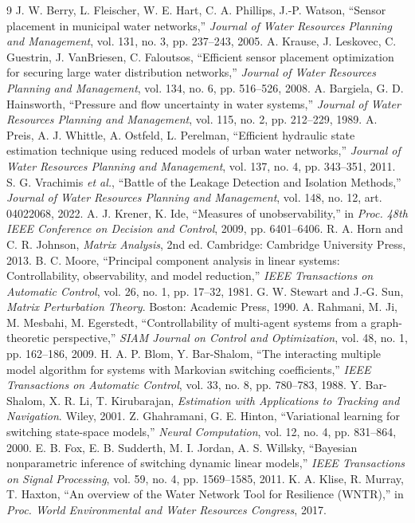 \documentclass[conference]{IEEEtran}
\begin{document}
\begin{thebibliography}{9}
 J. W. Berry, L. Fleischer, W. E. Hart, C. A. Phillips, J.-P. Watson, ``Sensor placement in municipal water networks,'' \emph{Journal of Water Resources Planning and Management}, vol. 131, no. 3, pp. 237--243, 2005.
 A. Krause, J. Leskovec, C. Guestrin, J. VanBriesen, C. Faloutsos, ``Efficient sensor placement optimization for securing large water distribution networks,'' \emph{Journal of Water Resources Planning and Management}, vol. 134, no. 6, pp. 516--526, 2008.
 A. Bargiela, G. D. Hainsworth, ``Pressure and flow uncertainty in water systems,'' \emph{Journal of Water Resources Planning and Management}, vol. 115, no. 2, pp. 212--229, 1989.
 A. Preis, A. J. Whittle, A. Ostfeld, L. Perelman, ``Efficient hydraulic state estimation technique using reduced models of urban water networks,'' \emph{Journal of Water Resources Planning and Management}, vol. 137, no. 4, pp. 343--351, 2011.
 S. G. Vrachimis \emph{et al.}, ``Battle of the Leakage Detection and Isolation Methods,'' \emph{Journal of Water Resources Planning and Management}, vol. 148, no. 12, art. 04022068, 2022.
 A. J. Krener, K. Ide, ``Measures of unobservability,'' in \emph{Proc. 48th IEEE Conference on Decision and Control}, 2009, pp. 6401--6406.
 R. A. Horn and C. R. Johnson, \emph{Matrix Analysis}, 2nd ed. Cambridge: Cambridge University Press, 2013.
 B. C. Moore, ``Principal component analysis in linear systems: Controllability, observability, and model reduction,'' \emph{IEEE Transactions on Automatic Control}, vol. 26, no. 1, pp. 17--32, 1981.
 G. W. Stewart and J.-G. Sun, \emph{Matrix Perturbation Theory}. Boston: Academic Press, 1990.
 A. Rahmani, M. Ji, M. Mesbahi, M. Egerstedt, ``Controllability of multi-agent systems from a graph-theoretic perspective,'' \emph{SIAM Journal on Control and Optimization}, vol. 48, no. 1, pp. 162--186, 2009.
 H. A. P. Blom, Y. Bar-Shalom, ``The interacting multiple model algorithm for systems with Markovian switching coefficients,'' \emph{IEEE Transactions on Automatic Control}, vol. 33, no. 8, pp. 780--783, 1988.
 Y. Bar-Shalom, X. R. Li, T. Kirubarajan, \emph{Estimation with Applications to Tracking and Navigation}. Wiley, 2001.
 Z. Ghahramani, G. E. Hinton, ``Variational learning for switching state-space models,'' \emph{Neural Computation}, vol. 12, no. 4, pp. 831--864, 2000.
 E. B. Fox, E. B. Sudderth, M. I. Jordan, A. S. Willsky, ``Bayesian nonparametric inference of switching dynamic linear models,'' \emph{IEEE Transactions on Signal Processing}, vol. 59, no. 4, pp. 1569--1585, 2011.
 K. A. Klise, R. Murray, T. Haxton, ``An overview of the Water Network Tool for Resilience (WNTR),'' in \emph{Proc. World Environmental and Water Resources Congress}, 2017.
\end{thebibliography}
\end{document}
